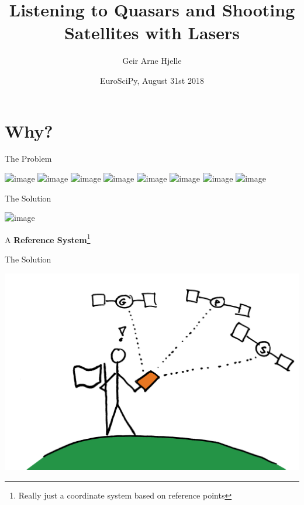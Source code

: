\documentclass[12pt,table,t]{beamer}
\title{Listening to Quasars and Shooting Satellites with Lasers}
\author{Geir Arne Hjelle}
\date{EuroSciPy, August 31st 2018}
\begin{document}
\frame[plain]{\titlepage}

\part{Why?}

\begin{frame}[c]{The Problem}
  \begin{center}
    \includegraphics<1>[width=\textwidth]{figure/altimetry_01}
    \includegraphics<2>[width=\textwidth]{figure/altimetry_02}
    \includegraphics<3>[width=\textwidth]{figure/altimetry_03}
    \includegraphics<4>[width=\textwidth]{figure/altimetry_04}
    \includegraphics<5>[width=\textwidth]{figure/altimetry_05}
    \includegraphics<6>[width=\textwidth]{figure/gps_01}
    \includegraphics<7>[width=\textwidth]{figure/gps_02}
    \includegraphics<8>[width=\textwidth]{figure/gps_03}
  \end{center}
\end{frame}


\begin{frame}[c]{The Solution}
  \begin{center}
    \includegraphics<1>[width=\textwidth]{figure/reference_system}
  \end{center}

  A \textbf{Reference System}\footnote{Really just a coordinate system based on reference points}
\end{frame}


\begin{frame}[c]{The Solution}
  \begin{center}
    \includegraphics[width=\textwidth]{figure/gps_04}
  \end{center}
\end{frame}
\end{document}

